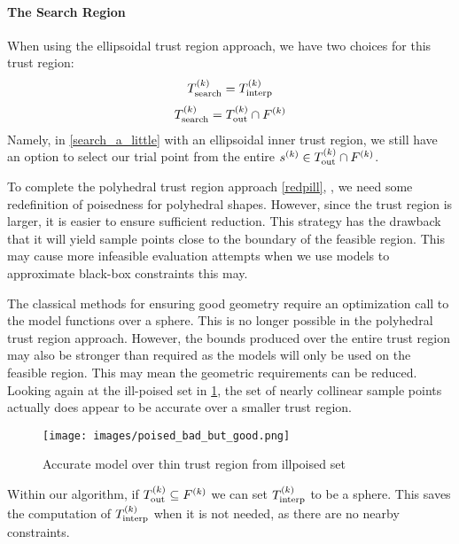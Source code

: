 \paragraph{The Search Region}
\label{search_region_choices}
When using the ellipsoidal trust region approach, we have two choices for this trust region:
\begin{align}
{T_{\text{search}}^{(k)}} = {T_{\text{interp}}^{(k)}} \label{search_a_little}
\end{align}
\begin{align}
{T_{\text{search}}^{(k)}} = {T_{\text{out}}^{(k)}} \cap {F}^{(k)} \label{search_a_lot}
\end{align}
Namely, in \cref{search_a_little} with an ellipsoidal inner trust region, we still have an option to select our trial point from the entire ${{s}^{(k)}} \in {T_{\text{out}}^{(k)}} \cap {F}^{(k)}$.

To complete the polyhedral trust region approach \cref{redpill}, %
, we need some redefinition of poisedness for polyhedral shapes.
However, since the trust region is larger, it is easier to ensure sufficient reduction.
This strategy has the drawback that it will yield sample points close to the boundary of the feasible region.
This may cause more infeasible evaluation attempts when we use models to approximate black-box constraints this may.

The classical methods for ensuring good geometry require an optimization call to the model functions over a sphere.
This is no longer possible in the polyhedral trust region approach.
However, the bounds produced over the entire trust region may also be stronger than required as the models will only be used on the feasible region.
This may mean the geometric requirements can be reduced.
\ifnum{}
Looking again at the ill-poised set in \cref{aoip}, the set of nearly collinear sample points actually does appear to be accurate over a smaller trust region.

\begin{figure}[h]
    \centering
    \texttt{[image: images/poised\_bad\_but\_good.png]}
    \caption{Accurate model over thin trust region from illpoised set}
    \label{aoip}
\end{figure}
\else
\fi

Within our algorithm, if $ {T_{\text{out}}^{(k)}} \subseteq {F}^{(k)}$ we can set $ {T_{\text{interp}}^{(k)}} $ to be a sphere.
This saves the computation of $ {T_{\text{interp}}^{(k)}} $ when it is not needed, as there are no nearby constraints.




